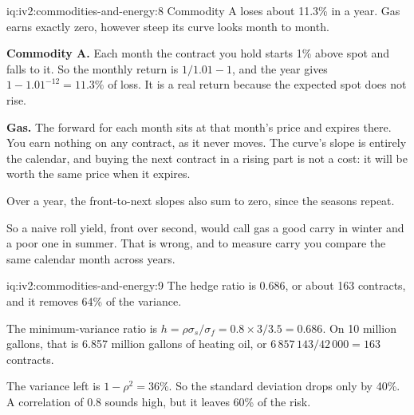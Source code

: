 \begin{solution}{iq:iv2:commodities-and-energy:8}
Commodity A loses about 11.3\% in a year. Gas earns exactly zero, however steep its curve looks month to month.

\textbf{Commodity A.} Each month the contract you hold starts 1\% above spot and falls to it. So the monthly return is $1/1.01 - 1$, and the year gives $1 - 1.01^{-12} = 11.3\%$ of loss. It is a real return because the expected spot does not rise.

\textbf{Gas.} The forward for each month sits at that month's price and expires there. You earn nothing on any contract, as it never moves. The curve's slope is entirely the calendar, and buying the next contract in a rising part is not a cost: it will be worth the same price when it expires.

Over a year, the front-to-next slopes also sum to zero, since the seasons repeat.

So a naive roll yield, front over second, would call gas a good carry in winter and a poor one in summer. That is wrong, and to measure carry you compare the same calendar month across years.

\end{solution}

\begin{solution}{iq:iv2:commodities-and-energy:9}
The hedge ratio is 0.686, or about 163 contracts, and it removes 64\% of the variance.

The minimum-variance ratio is $h = \rho\sigma_s/\sigma_f = 0.8 \times 3/3.5 = 0.686$. On 10 million gallons, that is 6.857 million gallons of heating oil, or $6\,857\,143/42\,000 = 163$ contracts.

The variance left is $1 - \rho^2 = 36\%$. So the standard deviation drops only by 40\%. A correlation of 0.8 sounds high, but it leaves 60\% of the risk.

\end{solution}

